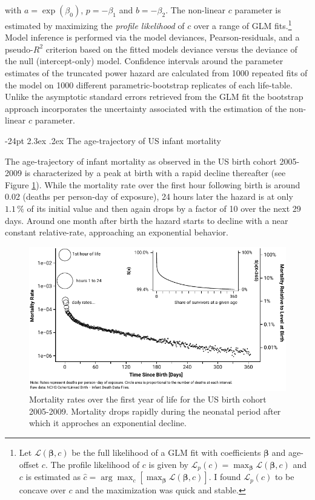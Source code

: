 \documentclass[10pt, twoside, parskip=half]{article}
\makeatletter
\def\maxwidth{\ifdim\Gin@nat@width>\linewidth\linewidth
  \else\Gin@nat@width\fi}
\let\Oldincludegraphics\includegraphics
\renewcommand{\includegraphics}[1]{\Oldincludegraphics[width=\maxwidth]{#1}}
\renewcommand\section{\@startsection {section}{1}{\z@}%
                                   {-24pt}%
                                   {2.3ex \@plus.2ex}%
                                   {\normalfont\large\bfseries}}
\makeatother
\begin{document}
with \(a = \exp(\beta_0)\), \(p=-\beta_1\) and \(b=-\beta_2\). The
non-linear \(c\) parameter is estimated by maximizing the \emph{profile
likelihood} \citep{Murphy2000} of \(c\) over a range of GLM
fits.\footnote{Let \(\mathcal{L}(\boldsymbol\beta,c)\) be the full
  likelihood of a GLM fit with coefficients \(\boldsymbol\beta\) and
  age-offset \(c\). The profile likelihood of \(c\) is given by
  \(\mathcal{L}_{p}(c) = \max_{\boldsymbol\beta} \mathcal{L}(\boldsymbol\beta,c)\)
  and \(c\) is estimated as
  \(\hat c = \arg\max_{c}[\max_{\boldsymbol\beta} \mathcal{L}(\boldsymbol\beta,c)]\).
  I found \(\mathcal{L}_{p}(c)\) to be concave over \(c\) and the
  maximization was quick and stable.} Model inference is performed via
the model deviances, Pearson-residuals, and a pseudo-\(R^2\) criterion
based on the fitted models deviance versus the deviance of the null
(intercept-only) model. Confidence intervals around the parameter
estimates of the truncated power hazard are calculated from 1000
repeated fits of the model on 1000 different parametric-bootstrap
replicates of each life-table. Unlike the asymptotic standard errors
retrieved from the GLM fit the bootstrap approach incorporates the
uncertainty associated with the estimation of the non-linear \(c\)
parameter.

\section{The age-trajectory of US infant
mortality}\label{the-age-trajectory-of-us-infant-mortality}

The age-trajectory of infant mortality as observed in the US birth
cohort 2005-2009 is characterized by a peak at birth with a rapid
decline thereafter (see Figure \ref{fig:plot-imort}). While the
mortality rate over the first hour following birth is around 0.02
(deaths per person-day of exposure), 24 hours later the hazard is at
only \(1.1\,\%\) of its initial value and then again drops by a factor
of 10 over the next 29 days. Around one month after birth the hazard
starts to decline with a near constant relative-rate, approaching an
exponential behavior.

\begin{figure}
\centering
\includegraphics{fig/figure2.pdf}
\caption{\label{fig:plot-imort}Mortality rates over the first year of life
for the US birth cohort 2005-2009. Mortality drops rapidly during the
neonatal period after which it approches an exponential decline.}
\end{figure}
\end{document}

